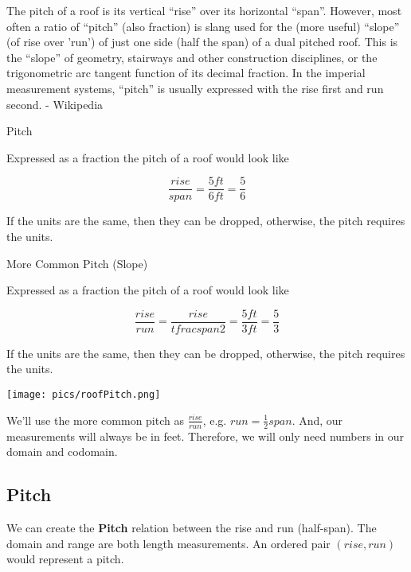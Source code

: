 \documentclass{ximera}
\author{Alan Yang}
\begin{document}
The pitch of a roof is its vertical ``rise'' over its horizontal ``span''. However, most often a ratio of ``pitch'' (also fraction) is slang used for the (more useful) ``slope'' (of rise over 'run') of just one side (half the span) of a dual pitched roof. This is the ``slope'' of geometry, stairways and other construction disciplines, or the trigonometric arc tangent function of its decimal fraction. In the imperial measurement systems, ``pitch'' is usually expressed with the rise first and run second. - Wikipedia


\begin{example} Pitch


Expressed as a fraction the pitch of a roof would look like

\[
\frac{rise}{span} = \frac{5 ft}{6 ft} = \frac{5}{6}
\]

If the units are the same, then they can be dropped, otherwise, the pitch requires the units.
\end{example}






\begin{example} More Common Pitch (Slope)


Expressed as a fraction the pitch of a roof would look like

\[
\frac{rise}{run} = \frac{rise}{tfrac{span}{2}} = \frac{5 ft}{3 ft} = \frac{5}{3}
\]

If the units are the same, then they can be dropped, otherwise, the pitch requires the units.
\end{example}






\begin{image}
\texttt{[image: pics/roofPitch.png]}
\end{image}


We'll use the more common pitch as $\frac{rise}{run}$, e.g. $run = \frac{1}{2} span$. And, our measurements will always be in feet.  Therefore, we will only need numbers in our domain and codomain.



\subsection{Pitch}
We can create the \textbf{Pitch} relation between the rise and run (half-span).  The domain and range are both length measurements.  An ordered pair $(rise, run)$ would represent a pitch.
\end{document}
